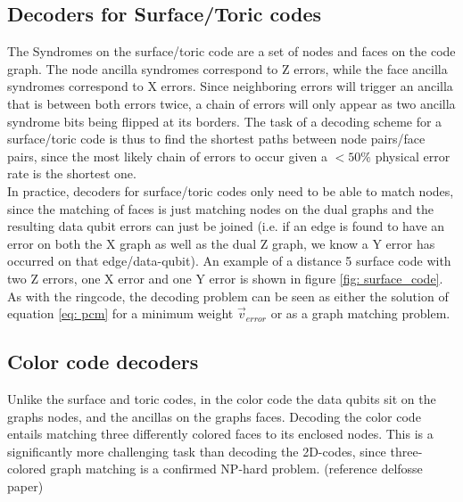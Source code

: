 \subsection{Decoders for Surface/Toric codes}
The Syndromes on the surface/toric code are a set of nodes and
faces on the code graph. The node ancilla syndromes correspond to
Z errors, while the face ancilla syndromes correspond to X errors.
Since neighboring errors will trigger an ancilla that is between 
both errors twice, a chain of errors will only appear as two ancilla
syndrome bits being flipped at its borders.
The task of a decoding scheme for a surface/toric code is thus to
find the shortest paths between node pairs/face pairs, since the most likely
chain of errors to occur given a $<50\%$ physical error rate is the 
shortest one.\\
In practice, decoders for surface/toric codes only need to be able to
match nodes, since the matching of faces is just matching nodes on the 
dual graphs and the resulting data qubit errors can just be joined
(i.e. if an edge is found to have an error on both the X graph as well as the
dual Z graph, we know a Y error has occurred on that edge/data-qubit).
An example of a distance 5 surface code with two Z errors, one X error and
one Y error is shown in figure \ref{fig: surface_code}.
As with the ringcode, the decoding problem can be seen as either the
solution of equation \ref{eq: pcm} for a minimum weight $\vec{v}_{error}$
or as a graph matching problem.



\subsection{Color code decoders}
Unlike the surface and toric codes, in the color code the 
data qubits sit on the graphs nodes, and the ancillas on the 
graphs faces. Decoding the color code entails matching 
three differently colored faces to its enclosed nodes.
This is a significantly more challenging task than
decoding the 2D-codes, since three-colored graph matching is a confirmed
NP-hard problem. (reference delfosse paper)

